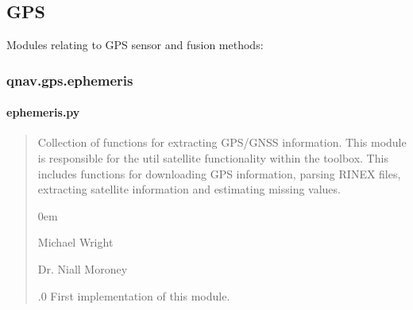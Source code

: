 \documentclass[letterpaper,10pt,english]{sphinxmanual}
\begin{document}
\subsection{GPS}
\label{\detokenize{usage/packages:gps}}
\sphinxAtStartPar
Modules relating to GPS sensor and fusion methods:

\sphinxstepscope


\subsubsection{qnav.gps.ephemeris}
\label{\detokenize{modules/gps/ephemeris:module-qnav.gps.ephemeris}}\label{\detokenize{modules/gps/ephemeris:qnav-gps-ephemeris}}\label{\detokenize{modules/gps/ephemeris::doc}}

\paragraph{ephemeris.py}
\label{\detokenize{modules/gps/ephemeris:ephemeris-py}}\begin{quote}\begin{description}
\sphinxAtStartPar
Collection of functions for extracting GPS/GNSS information.
This module is responsible for the util satellite functionality within
the toolbox. This includes functions for downloading GPS information,
parsing RINEX files, extracting satellite information and estimating
missing values.

\begin{DUlineblock}{0em}
\item[] Michael Wright \sphinxhyphen{} 
\item[] Dr. Niall Moroney \sphinxhyphen{} 
\end{DUlineblock}

.0 \sphinxhyphen{} First implementation of this module.

\end{description}\end{quote}
\end{document}
